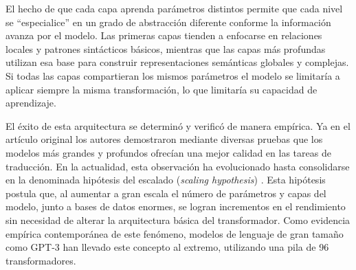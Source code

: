 El hecho de que cada capa aprenda parámetros distintos permite que cada nivel se ``especialice'' en un grado de abstracción diferente conforme la información avanza por el modelo. Las primeras capas tienden a enfocarse en relaciones locales y patrones sintácticos básicos, mientras que las capas más profundas utilizan esa base para construir representaciones semánticas globales y complejas. Si todas las capas compartieran los mismos parámetros el modelo se limitaría a aplicar siempre la misma transformación, lo que limitaría  su capacidad de aprendizaje.

El éxito de esta  arquitectura se determinó y verificó de manera empírica. 
Ya en el artículo original los autores demostraron mediante diversas 
pruebas que los modelos más grandes y profundos ofrecían una mejor calidad 
en las tareas de traducción. En la actualidad, esta observación ha 
evolucionado hasta consolidarse en la denominada hipótesis del escalado 
(\textit{scaling hypothesis}) \cite{kaplan2020scaling}. Esta hipótesis 
postula que, al aumentar a gran escala el número de parámetros y capas 
del modelo, junto a bases de datos enormes, se logran incrementos  en el 
rendimiento sin necesidad de alterar la arquitectura básica del transformador.
Como evidencia empírica contemporánea de este fenómeno, modelos de lenguaje de gran tamaño como GPT-3 han llevado este concepto al extremo, utilizando una pila de 96 transformadores.





